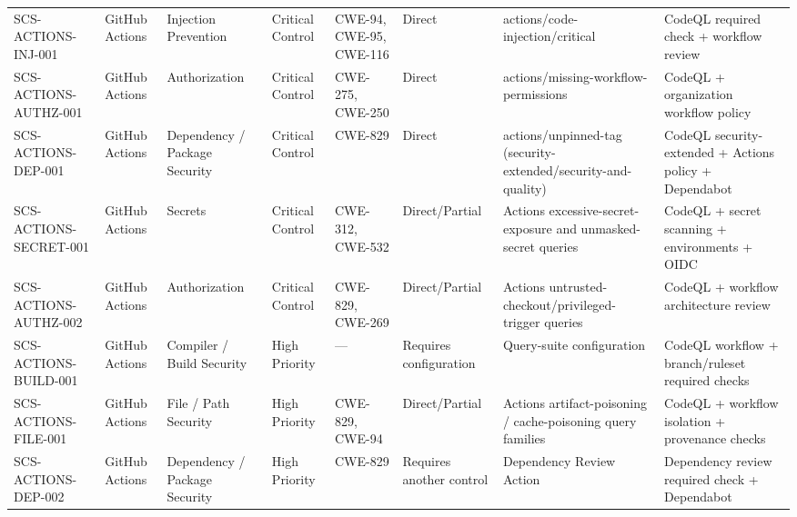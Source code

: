 \documentclass[10pt,letterpaper]{article}
\begin{document}
\begin{landscape}
\begin{longtable}{@{}P{1.0in}P{0.6in}P{0.95in}P{0.75in}P{0.85in}P{0.75in}P{2.0in}P{2.05in}@{}}
SCS-ACTIONS-INJ-001 & GitHub Actions & Injection Prevention & Critical Control & CWE-94, CWE-95, CWE-116 & Direct & actions/code-injection/critical & CodeQL required check + workflow review\\
SCS-ACTIONS-AUTHZ-001 & GitHub Actions & Authorization & Critical Control & CWE-275, CWE-250 & Direct & actions/missing-workflow-permissions & CodeQL + organization workflow policy\\
SCS-ACTIONS-DEP-001 & GitHub Actions & Dependency / Package Security & Critical Control & CWE-829 & Direct & actions/unpinned-tag (security-extended/security-and-quality) & CodeQL security-extended + Actions policy + Dependabot\\
SCS-ACTIONS-SECRET-001 & GitHub Actions & Secrets & Critical Control & CWE-312, CWE-532 & Direct/Partial & Actions excessive-secret-exposure and unmasked-secret queries & CodeQL + secret scanning + environments + OIDC\\
SCS-ACTIONS-AUTHZ-002 & GitHub Actions & Authorization & Critical Control & CWE-829, CWE-269 & Direct/Partial & Actions untrusted-checkout/privileged-trigger queries & CodeQL + workflow architecture review\\
SCS-ACTIONS-BUILD-001 & GitHub Actions & Compiler / Build Security & High Priority & --- & Requires configuration & Query-suite configuration & CodeQL workflow + branch/ruleset required checks\\
SCS-ACTIONS-FILE-001 & GitHub Actions & File / Path Security & High Priority & CWE-829, CWE-94 & Direct/Partial & Actions artifact-poisoning / cache-poisoning query families & CodeQL + workflow isolation + provenance checks\\
SCS-ACTIONS-DEP-002 & GitHub Actions & Dependency / Package Security & High Priority & CWE-829 & Requires another control & Dependency Review Action & Dependency review required check + Dependabot\\
\bottomrule
\end{longtable}
\end{landscape}
\end{document}
